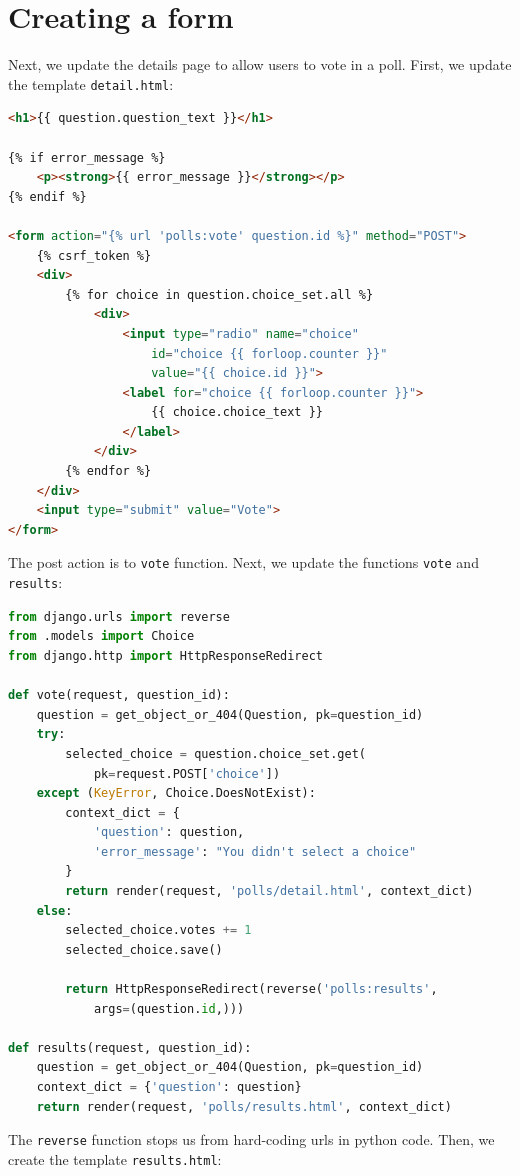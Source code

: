 \documentclass[a4paper, openany]{memoir}
\begin{document}
    \section{Creating a form}
    Next, we update the details page to allow users to vote in a poll. First, we update the template \texttt{detail.html}:
\begin{lstlisting}[language=html]
<h1>{{ question.question_text }}</h1>

{% if error_message %}
    <p><strong>{{ error_message }}</strong></p>
{% endif %}

<form action="{% url 'polls:vote' question.id %}" method="POST">
    {% csrf_token %}
    <div>
        {% for choice in question.choice_set.all %}
            <div>
                <input type="radio" name="choice" 
                    id="choice {{ forloop.counter }}" 
                    value="{{ choice.id }}">
                <label for="choice {{ forloop.counter }}">
                    {{ choice.choice_text }}
                </label>
            </div>
        {% endfor %}
    </div>
    <input type="submit" value="Vote">
</form>
\end{lstlisting}
    The post action is to \texttt{vote} function. Next, we update the functions \texttt{vote} and \texttt{results}:
\begin{lstlisting}[language=python]
from django.urls import reverse
from .models import Choice
from django.http import HttpResponseRedirect

def vote(request, question_id):
    question = get_object_or_404(Question, pk=question_id)
    try:
        selected_choice = question.choice_set.get(
            pk=request.POST['choice'])
    except (KeyError, Choice.DoesNotExist):
        context_dict = {
            'question': question,
            'error_message': "You didn't select a choice"
        }
        return render(request, 'polls/detail.html', context_dict)
    else:
        selected_choice.votes += 1
        selected_choice.save()
        
        return HttpResponseRedirect(reverse('polls:results', 
            args=(question.id,)))

def results(request, question_id):
    question = get_object_or_404(Question, pk=question_id)
    context_dict = {'question': question}
    return render(request, 'polls/results.html', context_dict)
\end{lstlisting}
    The \texttt{reverse} function stops us from hard-coding urls in python code. Then, we create the template \texttt{results.html}:
\end{document}
